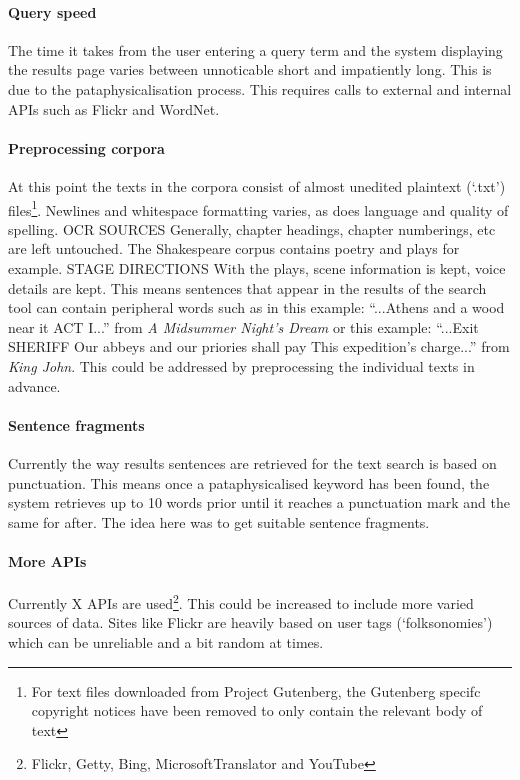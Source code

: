 \paragraph{Query speed} 
The time it takes from the user entering a query term and the system displaying the results page varies between unnoticable short and impatiently long. This is due to the pataphysicalisation process. This requires calls to external and internal \ac{API}s such as Flickr and WordNet.

\paragraph{Preprocessing corpora} 
At this point the texts in the corpora consist of almost unedited plaintext (`.txt') files\footnote{For text files downloaded from Project Gutenberg, the Gutenberg specifc copyright notices have been removed to only contain the relevant body of text}. Newlines and whitespace formatting varies, as does language and quality of spelling. OCR SOURCES Generally, chapter headings, chapter numberings, etc are left untouched. The Shakespeare corpus contains poetry and plays for example. STAGE DIRECTIONS With the plays, scene information is kept, voice details are kept. This means sentences that appear in the results of the search tool can contain peripheral words such as in this example: ``...Athens and a wood near it ACT I...'' from \textit{A Midsummer Night's Dream} or this example: ``...Exit SHERIFF Our abbeys and our priories shall pay This expedition's charge...'' from \textit{King John}. This could be addressed by preprocessing the individual texts in advance.

\paragraph{Sentence fragments} 
Currently the way results sentences are retrieved for the text search is based on punctuation. This means once a pataphysicalised keyword has been found, the system retrieves up to 10 words prior until it reaches a punctuation mark and the same for after. The idea here was to get suitable sentence fragments.

\paragraph{More APIs} 
Currently X \ac{API}s are used\footnote{Flickr, Getty, Bing, MicrosoftTranslator and YouTube}. This could be increased to include more varied sources of data. Sites like Flickr are heavily based on user tags (`folksonomies') which can be unreliable and a bit random at times.

